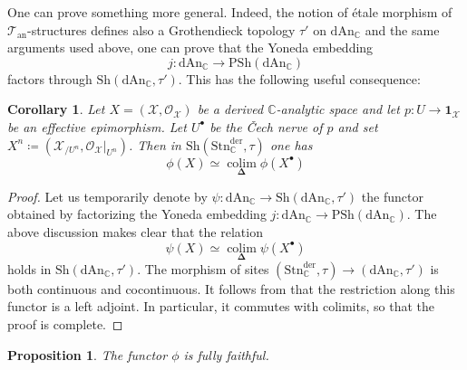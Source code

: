 \documentclass[12pt,a4paper,reqno]{amsart}
\theoremstyle{plain}
\newtheorem{prop}[thm]{Proposition}
\newtheorem{cor}[thm]{Corollary}
\theoremstyle{definition}
\theoremstyle{remark}
\numberwithin{equation}{section}
\begin{document}
One can prove something more general. Indeed, the notion of \'etale morphism of ${{\mathcal T}_{\mathrm{an}}}$-structures defines also a Grothendieck topology $\tau'$ on ${\mathrm{dAn}_{\mathbb C}}$ and the same arguments used above, one can prove that the Yoneda embedding
\[ j \colon {\mathrm{dAn}_{\mathbb C}} \to {\mathrm{PSh}}({\mathrm{dAn}_{\mathbb C}}) \]
factors through ${\mathrm{Sh}}({\mathrm{dAn}_{\mathbb C}}, \tau')$.
This has the following useful consequence:

\begin{cor} \label{cor:little_phi_commutes_with_etale_colimits}
	Let $X = ({\mathcal X}, {\mathcal O}_{\mathcal X})$ be a derived {$\mathbb C$-analytic\xspace} space and let $p \colon U \to \mathbf 1_{\mathcal X}$ be an effective epimorphism.
	Let $U^\bullet$ be the \v{C}ech nerve of $p$ and set $X^n \coloneqq ({\mathcal X}_{/U^n}, {\mathcal O}_{\mathcal X}|_{U^n})$.
	Then in ${\mathrm{Sh}}({\mathrm{Stn}^{\mathrm{der}}_{\mathbb C}}, \tau)$ one has
	\[ \phi(X) \simeq \operatorname*{colim}_{\mathbf \Delta} \phi(X^\bullet) \]
\end{cor}

\begin{proof}
	Let us temporarily denote by $\psi \colon {\mathrm{dAn}_{\mathbb C}} \to {\mathrm{Sh}}({\mathrm{dAn}_{\mathbb C}}, \tau')$ the functor obtained by factorizing the Yoneda embedding $j \colon {\mathrm{dAn}_{\mathbb C}} \to {\mathrm{PSh}}({\mathrm{dAn}_{\mathbb C}})$.
	The above discussion makes clear that the relation
	\[ \psi(X) \simeq \operatorname*{colim}_{\mathbf \Delta} \psi(X^\bullet) \]
	holds in ${\mathrm{Sh}}({\mathrm{dAn}_{\mathbb C}}, \tau')$.
	The morphism of sites $({\mathrm{Stn}^{\mathrm{der}}_{\mathbb C}}, \tau) \to ({\mathrm{dAn}_{\mathbb C}}, \tau')$ is both continuous and cocontinuous.
	It follows from \cite[Lemma 2.30]{Porta_Yu_Higher_analytic_stacks_2014} that the restriction along this functor is a left adjoint.
	{\ignorespaces}
	In particular, it commutes with colimits, so that the proof is complete.
\end{proof}

\begin{prop} \label{prop:little_phi_fully_faithful}
	The functor $\phi$ is fully faithful.
\end{prop}
\end{document}
